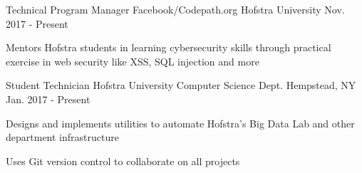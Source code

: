 

\begin{cventries}

\cventry
    {Technical Program Manager} %
    {Facebook/Codepath.org} %
    {Hofstra University} %
    {Nov. 2017 - Present} %
    {
      \begin{cvitems} %
        \item {Mentors Hofstra students in learning cybersecurity skills through practical exercise in web security like XSS, SQL injection and more}
      \end{cvitems}
    }

  \cventry
    {Student Technician} %
    {Hofstra University Computer Science Dept.} %
    {Hempstead, NY} %
    {Jan. 2017 - Present} %
    {
      \begin{cvitems} %
        \item {Designs and implements utilities to automate Hofstra's Big Data Lab and other department infrastructure}
        \item {Uses Git version control to collaborate on all projects}
      \end{cvitems}
    }

\end{cventries}
